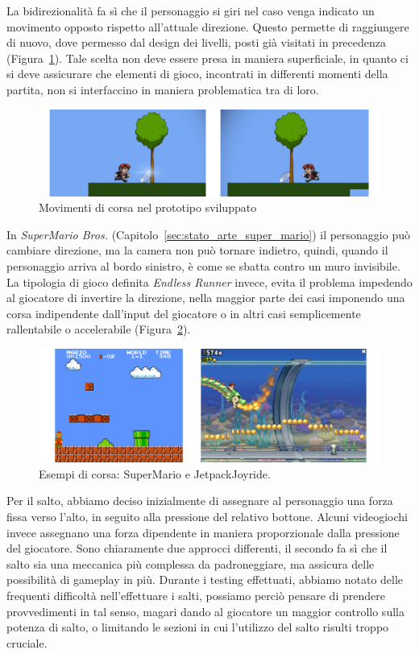 La bidirezionalità fa sì che il personaggio si giri nel caso venga indicato un movimento opposto rispetto all’attuale direzione. Questo permette di raggiungere di nuovo, dove permesso dal design dei livelli, posti già visitati in precedenza (Figura~\ref{fig:platform_corsa}). Tale scelta non deve essere presa in maniera superficiale, in quanto ci si deve assicurare che elementi di gioco, incontrati in differenti momenti della partita, non si interfaccino in maniera problematica tra di loro. 
\begin{figure}%
	\centering
	\includegraphics[width= \columnwidth]{images/gameDesign/03.jpg}
	\caption{Movimenti di corsa nel prototipo sviluppato}
	\label{fig:platform_corsa}
\end{figure}
In \textit{SuperMario Bros.} (Capitolo~\ref{sec:stato_arte_super_mario}) il personaggio può cambiare direzione, ma la camera non può tornare indietro, quindi, quando il personaggio arriva al bordo sinistro, è come se sbatta contro un muro invisibile.
La tipologia di gioco definita \textit{Endless Runner} invece, evita il problema impedendo al giocatore di invertire la direzione, nella maggior parte dei casi imponendo una corsa indipendente dall’input del giocatore o in altri casi semplicemente rallentabile o accelerabile (Figura~\ref{fig:platform_corsa_reali}).

\begin{figure}%
	\centering
	\includegraphics[width= \columnwidth]{images/gameDesign/04.jpg}
	\caption{Esempi di corsa: SuperMario e JetpackJoyride.}
	\label{fig:platform_corsa_reali}
\end{figure}

Per il salto, abbiamo deciso inizialmente di assegnare al personaggio una forza fissa verso l’alto, in seguito alla pressione del relativo bottone. Alcuni videogiochi invece assegnano una forza dipendente in maniera proporzionale dalla pressione del giocatore. Sono chiaramente due approcci differenti, il secondo fa sì che il salto sia una meccanica più complessa da padroneggiare, ma assicura delle possibilità di gameplay in più.
Durante i testing effettuati, abbiamo notato delle frequenti difficoltà nell’effettuare i salti, possiamo perciò pensare di prendere provvedimenti in tal senso, magari dando al giocatore un maggior controllo sulla potenza di salto, o limitando le sezioni in cui l’utilizzo del salto risulti troppo cruciale.


